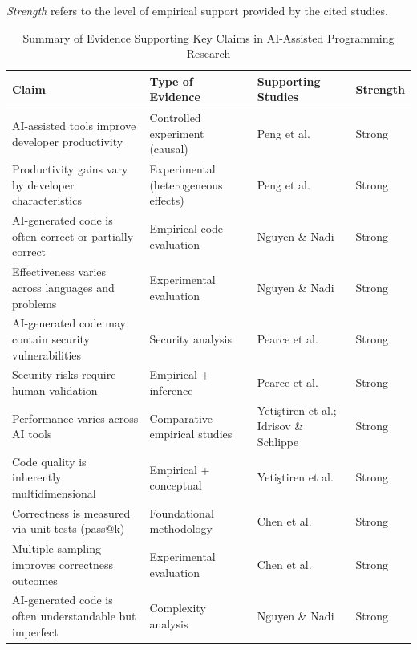 \documentclass[conference]{IEEEtran}
\begin{document}
\begin{table}[t]
\centering
\caption{Summary of Evidence Supporting Key Claims in AI-Assisted Programming Research}
\label{tab:evidence}
\footnotesize{\textit{Strength} refers to the level of empirical support provided by the cited studies.}
\renewcommand{\arraystretch}{1.2}
\begin{tabular}{p{4.8cm} p{4.5cm} p{3.5cm} p{2cm}}
\hline
\textbf{Claim} & \textbf{Type of Evidence} & \textbf{Supporting Studies} & \textbf{Strength} \\
\hline

AI-assisted tools improve developer productivity & Controlled experiment (causal) & Peng et al. & Strong \\

Productivity gains vary by developer characteristics & Experimental (heterogeneous effects) & Peng et al. & Strong \\

AI-generated code is often correct or partially correct & Empirical code evaluation & Nguyen \& Nadi & Strong \\

Effectiveness varies across languages and problems & Experimental evaluation & Nguyen \& Nadi & Strong \\

AI-generated code may contain security vulnerabilities & Security analysis & Pearce et al. & Strong \\

Security risks require human validation & Empirical + inference & Pearce et al. & Strong \\

Performance varies across AI tools & Comparative empirical studies & Yetiştiren et al.; Idrisov \& Schlippe & Strong \\

Code quality is inherently multidimensional & Empirical + conceptual & Yetiştiren et al. & Strong \\

Correctness is measured via unit tests (pass@k) & Foundational methodology & Chen et al. & Strong \\

Multiple sampling improves correctness outcomes & Experimental evaluation & Chen et al. & Strong \\

AI-generated code is often understandable but imperfect & Complexity analysis & Nguyen \& Nadi & Strong \\


\end{tabular}
\end{table}
\end{document}
